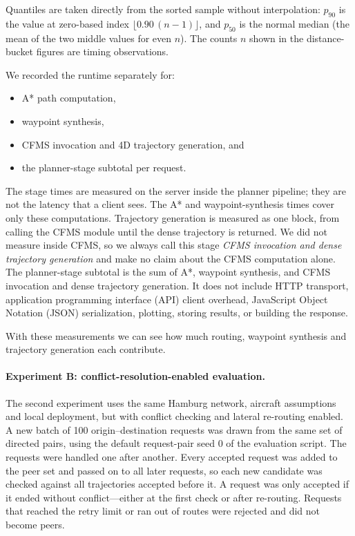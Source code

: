 Quantiles are taken directly from the sorted sample without interpolation: \(p_{90}\) is the value at zero-based index \(\lfloor 0.90\,(n-1) \rfloor\), and \(p_{50}\) is the normal median (the mean of the two middle values for even \(n\)). The counts \(n\) shown in the distance-bucket figures are timing observations.

We recorded the runtime separately for:
\begin{itemize}
    \item A* path computation,
    \item waypoint synthesis,
    \item CFMS invocation and 4D trajectory generation, and
    \item the planner-stage subtotal per request.
\end{itemize}

The stage times are measured on the server inside the planner pipeline; they are not the latency that a client sees. The A* and waypoint-synthesis times cover only these computations. Trajectory generation is measured as one block, from calling the CFMS module until the dense trajectory is returned. We did not measure inside CFMS, so we always call this stage \emph{CFMS invocation and dense trajectory generation} and make no claim about the CFMS computation alone. The planner-stage subtotal is the sum of A*, waypoint synthesis, and CFMS invocation and dense trajectory generation. It does not include HTTP transport, application programming interface (API) client overhead, JavaScript Object Notation (JSON) serialization, plotting, storing results, or building the response.

With these measurements we can see how much routing, waypoint synthesis and trajectory generation each contribute.

\paragraph{Experiment B: conflict-resolution-enabled evaluation.}
The second experiment uses the same Hamburg network, aircraft assumptions and local deployment, but with conflict checking and lateral re-routing enabled. A new batch of 100 origin--destination requests was drawn from the same set of directed pairs, using the default request-pair seed 0 of the evaluation script. The requests were handled one after another. Every accepted request was added to the peer set and passed on to all later requests, so each new candidate was checked against all trajectories accepted before it. A request was only accepted if it ended without conflict---either at the first check or after re-routing. Requests that reached the retry limit or ran out of routes were rejected and did not become peers.


